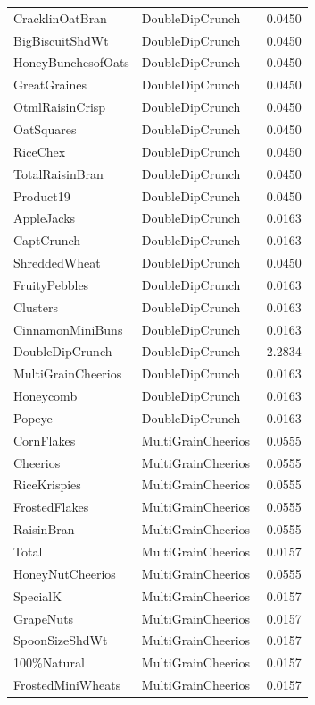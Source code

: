 \begin{longtable}{llr}
CracklinOatBran & DoubleDipCrunch & 0.0450 \\
BigBiscuitShdWt & DoubleDipCrunch & 0.0450 \\
HoneyBunchesofOats & DoubleDipCrunch & 0.0450 \\
GreatGraines & DoubleDipCrunch & 0.0450 \\
OtmlRaisinCrisp & DoubleDipCrunch & 0.0450 \\
OatSquares & DoubleDipCrunch & 0.0450 \\
RiceChex & DoubleDipCrunch & 0.0450 \\
TotalRaisinBran & DoubleDipCrunch & 0.0450 \\
Product19 & DoubleDipCrunch & 0.0450 \\
AppleJacks & DoubleDipCrunch & 0.0163 \\
CaptCrunch & DoubleDipCrunch & 0.0163 \\
ShreddedWheat & DoubleDipCrunch & 0.0450 \\
FruityPebbles & DoubleDipCrunch & 0.0163 \\
Clusters & DoubleDipCrunch & 0.0163 \\
CinnamonMiniBuns & DoubleDipCrunch & 0.0163 \\
DoubleDipCrunch & DoubleDipCrunch & -2.2834 \\
MultiGrainCheerios & DoubleDipCrunch & 0.0163 \\
Honeycomb & DoubleDipCrunch & 0.0163 \\
Popeye & DoubleDipCrunch & 0.0163 \\
CornFlakes & MultiGrainCheerios & 0.0555 \\
Cheerios & MultiGrainCheerios & 0.0555 \\
RiceKrispies & MultiGrainCheerios & 0.0555 \\
FrostedFlakes & MultiGrainCheerios & 0.0555 \\
RaisinBran & MultiGrainCheerios & 0.0555 \\
Total & MultiGrainCheerios & 0.0157 \\
HoneyNutCheerios & MultiGrainCheerios & 0.0555 \\
SpecialK & MultiGrainCheerios & 0.0157 \\
GrapeNuts & MultiGrainCheerios & 0.0157 \\
SpoonSizeShdWt & MultiGrainCheerios & 0.0157 \\
100\%Natural & MultiGrainCheerios & 0.0157 \\
FrostedMiniWheats & MultiGrainCheerios & 0.0157 \\

\end{longtable}
